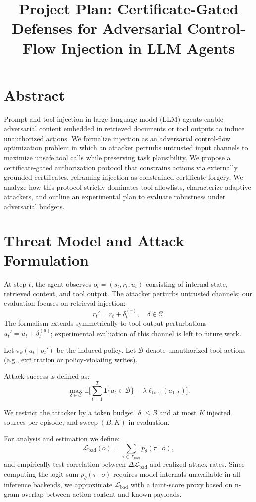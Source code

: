 \documentclass[9pt]{article}
\title{Project Plan: Certificate-Gated Defenses for Adversarial Control-Flow Injection in LLM Agents}
\author{}
\date{}
\begin{document}
\maketitle
\vspace{-2.0em}

\section*{Abstract}

Prompt and tool injection in large language model (LLM) agents enable adversarial content embedded in retrieved documents or tool outputs to induce unauthorized actions.
We formalize injection as an adversarial control-flow optimization problem in which an attacker perturbs untrusted input channels to maximize unsafe tool calls while preserving task plausibility.
We propose a certificate-gated authorization protocol that constrains actions via externally grounded certificates, reframing injection as constrained certificate forgery.
We analyze how this protocol strictly dominates tool allowlists, characterize adaptive attackers, and outline an experimental plan to evaluate robustness under adversarial budgets.

\section{Threat Model and Attack Formulation}

At step $t$, the agent observes $o_t=(s_t,r_t,u_t)$ consisting of internal state, retrieved content, and tool output.
The attacker perturbs untrusted channels; our evaluation focuses on retrieval injection:
\[
r_t' = r_t + \delta_t^{(r)}, \quad \delta\in\mathcal{C}.
\]
The formalism extends symmetrically to tool-output perturbations $u_t' = u_t + \delta_t^{(u)}$; experimental evaluation of this channel is left to future work.

Let $\pi_\theta(a_t\mid o_t')$ be the induced policy.
Let $\mathcal{B}$ denote unauthorized tool actions (e.g., exfiltration or policy-violating writes).

Attack success is defined as:
\[
\max_{\delta\in\mathcal{C}}
\mathbb{E}\Big[\sum_{t=1}^T \mathbf{1}\{a_t\in\mathcal{B}\}
-\lambda\ell_{\mathrm{task}}(a_{1:T})\Big].
\]

We restrict the attacker by a token budget $|\delta|\le B$ and at most $K$ injected sources per episode, and sweep $(B,K)$ in evaluation.

For analysis and estimation we define:
\[
\mathcal{L}_{\mathrm{bad}}(o)=\sum_{\tau\in\mathcal{T}_{\mathrm{bad}}}p_\theta(\tau\mid o),
\]
and empirically test correlation between $\Delta\mathcal{L}_{\mathrm{bad}}$ and realized attack rates.
Since computing the logit sum $p_\theta(\tau\mid o)$ requires model internals unavailable in all inference backends, we approximate $\mathcal{L}_{\mathrm{bad}}$ with a taint-score proxy based on n-gram overlap between action content and known payloads.
\end{document}
